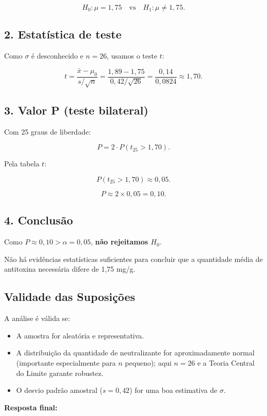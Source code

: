 \documentclass[12pt]{article}
\begin{document}
\[
H_0: \mu = 1,75 
\quad\text{vs}\quad 
H_1: \mu \neq 1,75.
\]

\subsection*{2. Estatística de teste}

Como \(\sigma\) é desconhecido e \(n=26\), usamos o teste \(t\):

\[
t = \frac{\bar{x} - \mu_0}{s/\sqrt{n}}
= \frac{1,89 - 1,75}{0,42/\sqrt{26}}
= \frac{0,14}{0,0824} 
\approx 1,70.
\]

\subsection*{3. Valor P (teste bilateral)}

Com 25 graus de liberdade:

\[
P = 2 \cdot P(t_{25} > 1,70).
\]

Pela tabela \(t\):

\[
P(t_{25} > 1,70) \approx 0,05.
\]

\[
P \approx 2 \times 0,05 = 0,10.
\]

\subsection*{4. Conclusão}

Como \(P \approx 0,10 > \alpha=0,05\), \textbf{não rejeitamos \(H_0\)}.

Não há evidências estatísticas suficientes para concluir que a quantidade média de antitoxina necessária difere de 1,75 mg/g.

\subsection*{Validade das Suposições}

A análise é válida se:
\begin{itemize}
    \item A amostra for aleatória e representativa.
    \item A distribuição da quantidade de neutralizante for aproximadamente normal (importante especialmente para \(n\) pequeno); aqui \(n=26\) e a Teoria Central do Limite garante robustez.
    \item O desvio padrão amostral (\(s=0,42\)) for uma boa estimativa de \(\sigma\).
\end{itemize}

\textbf{Resposta final:}
\end{document}
